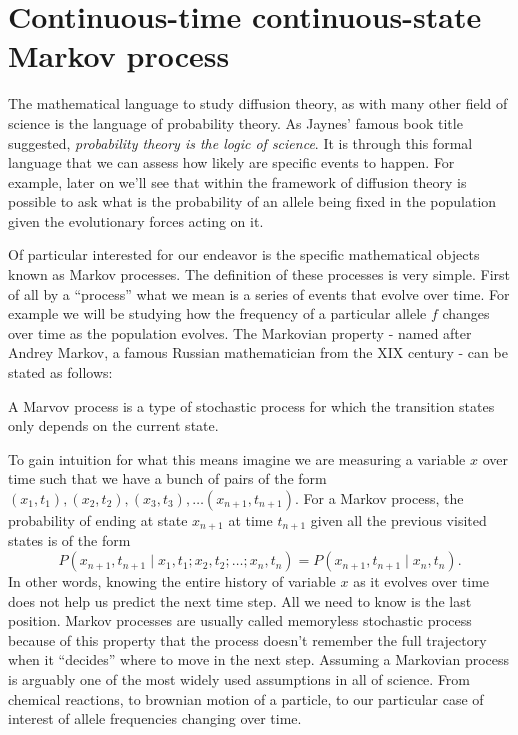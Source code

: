 \section{Continuous-time continuous-state Markov process}

The mathematical language to study diffusion theory, as with many other field of
science is the language of probability theory. As Jaynes' famous book title
suggested, \textit{probability theory is the logic of science}. It is through
this formal language that we can assess how likely are specific events to
happen. For example, later on we'll see that within the framework of diffusion
theory is possible to ask what is the probability of an allele being fixed in
the population given the evolutionary forces acting on it.

Of particular interested for our endeavor is the specific mathematical objects
known as Markov processes. The definition of these processes is very simple.
First of all by a ``process'' what we mean is a series of events that evolve
over time. For example we will be studying how the frequency of a particular
allele $f$ changes over time as the population evolves. The Markovian property -
named after Andrey Markov, a famous Russian mathematician from the XIX century -
can be stated as follows:
\begin{tcolorbox}
  A Marvov process is a type of stochastic process for which the transition
  states only depends on the current state.
\end{tcolorbox}
To gain intuition for what this means imagine we are measuring a variable $x$
over time such that we have a bunch of pairs of the form $(x_1, t_1), (x_2,
t_2), (x_3, t_3), \ldots (x_{n+1}, t_{n+1})$. For a Markov process, the
probability of ending at state $x_{n+1}$ at time $t_{n+1}$ given all the
previous visited states is of the form
\begin{equation}
  P(x_{n+1}, t_{n+1} \mid x_1, t_1; x_2, t_2; \ldots; x_n, t_n) =
  P(x_{n+1}, t_{n+1} \mid x_n, t_n).
  \label{eq_chapman_kolmogorov}
\end{equation}
In other words, knowing the entire history of variable $x$ as it evolves over
time does not help us predict the next time step. All we need to know is the
last position. Markov processes are usually called memoryless stochastic process
because of this property that the process doesn't remember the full trajectory
when it ``decides'' where to move in the next step. Assuming a Markovian process
is arguably one of the most widely used assumptions in all of science. From
chemical reactions, to brownian motion of a particle, to our particular case of
interest of allele frequencies changing over time.

